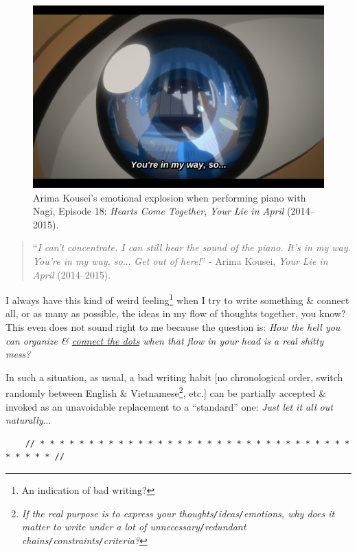 \documentclass[12pt]{article}
\begin{document}
\begin{figure}[H]
	\centering
	\includegraphics[width = 15cm]{Arima_Kousei_you_are_in_my_way}
	\caption{Arima Kousei's emotional explosion when performing piano with Nagi, Episode 18: {\it Hearts Come Together}, {\it Your Lie in April} (2014--2015).}
	\label{fig2}
\end{figure}

\begin{quotation}
	``{\it I can't concentrate. I can still hear the sound of the piano. It's in my way. You're in my way, so$\ldots$ Get out of here!}'' - Arima Kousei, {\it Your Lie in April} (2014--2015).
\end{quotation}

I always have this kind of weird feeling\footnote{An indication of bad writing?} when I try to write something \& connect all, or as many as possible, the ideas in my flow of thoughts together, you know? This even does not sound right to me because the question is: {\it How the hell you can organize \& \href{https://en.wikipedia.org/wiki/Connect_the_dots}{connect the dots} when that flow in your head is a real shitty mess?}

In such a situation, as usual, a bad writing habit [no chronological order, switch randomly between English \& Vietnamese\footnote{{\it If the real purpose is to express your thoughts{\tt/}ideas{\tt/}emotions, why does it matter to write under a lot of unnecessary{\tt/}redundant chains{\tt/}constraints{\tt/}criteria?}}, etc.] can be partially accepted \& invoked as an unavoidable replacement to a ``standard'' one: {\it Just let it all out naturally$\ldots$}

\begin{verbatim}
	// * * * * * * * * * * * * * * * * * * * * * * * * * * * * * * * * * * * * * //
\end{verbatim}
\end{document}
